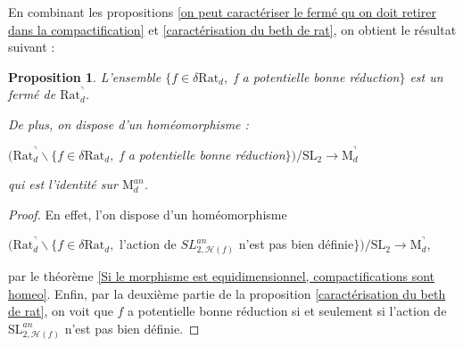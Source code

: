 \documentclass[11pt]{article}
\newcommand{\Rat}{\mathrm{Rat}}
\newcommand{\SL}{\mathrm{SL}}
\newcommand{\M}{\mathrm{M}}
\newtheorem{prop}[thm]{Proposition}
\begin{document}
En combinant les propositions \ref{on peut caractériser le fermé qu on doit retirer dans la compactification} et \ref{caractérisation du beth de rat}, on obtient le résultat suivant :
 
\begin{prop}\label{bijection entre Rat_d quot et M_d}
L'ensemble $\lbrace f\in \delta \Rat_d,$ f a potentielle bonne réduction$\rbrace$ est un fermé de $\Rat_d^\urcorner$.

De plus, on dispose d'un homéomorphisme :
\begin{center}
$(\Rat_d^\urcorner \backslash \lbrace f\in \delta \Rat_d,$ f a potentielle bonne réduction$\rbrace)/\SL_2 \rightarrow \M_d^\urcorner$
\end{center}
qui est l'identité sur $\M_d^{an}$.
\end{prop}
\begin{proof}
En effet, l'on dispose d'un homéomorphisme
\begin{center}
$(\Rat_d^\urcorner \backslash \lbrace f\in \delta \Rat_d,$ l'action de $SL_{2,\mathcal{H}(f)}^{an}$ n'est pas bien définie$\rbrace)/\SL_2 \rightarrow \M_d^\urcorner$, 
\end{center}
par le théorème \ref{Si le morphisme est equidimensionnel, compactifications sont homeo}. Enfin, par la deuxième partie de la proposition \ref{caractérisation du beth de rat}, on voit que $f$ a potentielle bonne réduction si et seulement si l'action de $\SL_{2,\mathcal{H}(f)}^{an}$ n'est pas bien définie.
\end{proof}



\end{document}
